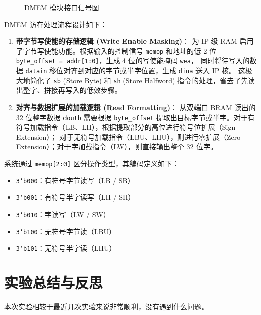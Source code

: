 \documentclass[12pt, a4paper]{ctexart}
\begin{document}
\begin{figure}[H]
    \centering
    \caption{DMEM 模块接口信号图}
    \label{fig:dmem_block}
\end{figure}

DMEM 访存处理流程设计如下：
\begin{enumerate}
    \item \textbf{带字节写使能的存储逻辑 (Write Enable Masking)}：
    为 IP 级 RAM 启用了字节写使能功能。根据输入的控制信号 \texttt{memop} 和地址的低 2 位
    \texttt{byte\_offset = addr[1:0]}，生成 4 位的写使能掩码 \texttt{wea}，
    同时将待写入的数据 \texttt{datain} 移位对齐到对应的字节或半字位置，生成 \texttt{dina} 送入 IP 核。
    这极大地简化了 \texttt{sb} (Store Byte) 和 \texttt{sh} (Store Halfword) 指令的处理，省去了先读出整字、拼接再写入的低效步骤。
    
    \item \textbf{对齐与数据扩展的加载逻辑 (Read Formatting)}：
    从双端口 BRAM 读出的 32 位整字数据 \texttt{doutb} 需要根据 \texttt{byte\_offset}
    提取出目标字节或半字。对于有符号加载指令（LB、LH），根据提取部分的高位进行符号位扩展（Sign Extension）；
    对于无符号加载指令（LBU、LHU），则进行零扩展（Zero Extension）；对于字加载指令（LW），则直接输出整个 32 位字。
\end{enumerate}

系统通过 \texttt{memop[2:0]} 区分操作类型，其编码定义如下：
\begin{itemize}
    \item \texttt{3'b000}：有符号字节读写（LB / SB）
    \item \texttt{3'b001}：有符号半字读写（LH / SH）
    \item \texttt{3'b010}：字读写（LW / SW）
    \item \texttt{3'b100}：无符号字节读（LBU）
    \item \texttt{3'b101}：无符号半字读（LHU）
\end{itemize}

\section{实验总结与反思}

本次实验相较于最近几次实验来说非常顺利，没有遇到什么问题。
\end{document}
